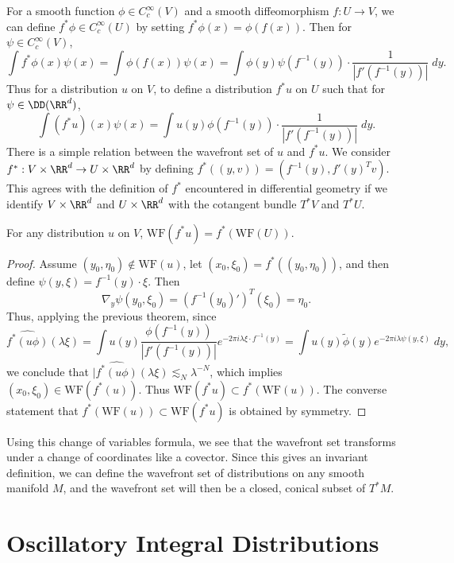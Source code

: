 For a smooth function $\phi \in C_c^\infty(V)$ and a smooth diffeomorphism $f: U \to V$, we can define $f^* \phi \in C_c^\infty(U)$ by setting $f^* \phi(x) = \phi(f(x))$. Then for $\psi \in C_c^\infty(V)$,
%
\[ \int f^* \phi(x) \psi(x) = \int \phi(f(x)) \psi(x) = \int \phi(y) \psi(f^{-1}(y)) \cdot \frac{1}{|f'(f^{-1}(y))|} \; dy. \]
%
Thus for a distribution $u$ on $V$, to define a distribution $f^* u$ on $U$ such that for $\psi \in \DD(\RR^d)$,
%
\[ \int (f^* u)(x) \psi(x) = \int u(y) \phi(f^{-1}(y)) \cdot \frac{1}{|f'(f^{-1}(y))|}\; dy. \]
%
There is a simple relation between the wavefront set of $u$ and $f^* u$. We consider $f^*: V \times \RR^d \to U \times \RR^d$ by defining $f^*((y,v)) = (f^{-1}(y), f'(y)^T v)$. This agrees with the definition of $f^*$ encountered in differential geometry if we identify $V \times \RR^d$ and $U \times \RR^d$ with the cotangent bundle $T^* V$ and $T^* U$.

\begin{theorem}
    For any distribution $u$ on $V$, $\text{WF}(f^* u) = f^*(\text{WF}(U))$.
\end{theorem}
\begin{proof}
    Assume $(y_0,\eta_0) \not \in \text{WF}(u)$, let $(x_0,\xi_0) = f^*((y_0,\eta_0))$, and then define $\psi(y,\xi) = f^{-1}(y) \cdot \xi$. Then
    \[ \nabla_y \psi(y_0,\xi_0) = (f^{-1}(y_0)')^T(\xi_0) = \eta_0. \]
    Thus, applying the previous theorem, since
    \[ \widehat{f^*(u \phi)}(\lambda \xi) = \int u(y) \frac{\phi(f^{-1}(y))}{|f'(f^{-1}(y))|} e^{-2 \pi i \lambda \xi \cdot f^{-1}(y)} = \int u(y) \tilde{\phi}(y) e^{-2 \pi i \lambda \psi(y,\xi)}\; dy, \]
    we conclude that $|\widehat{f^*(u \phi)}(\lambda \xi) \lesssim_N \lambda^{-N}$, which implies $(x_0,\xi_0) \in \text{WF}(f^*(u))$. Thus $\text{WF}(f^* u) \subset f^*(\text{WF}(u))$. The converse statement that $f^*(\text{WF}(u)) \subset \text{WF}(f^* u)$ is obtained by symmetry.
\end{proof}

Using this change of variables formula, we see that the wavefront set transforms under a change of coordinates like a covector. Since this gives an invariant definition, we can define the wavefront set of distributions on any smooth manifold $M$, and the wavefront set will then be a closed, conical subset of $T^* M$.

\section{Oscillatory Integral Distributions}

